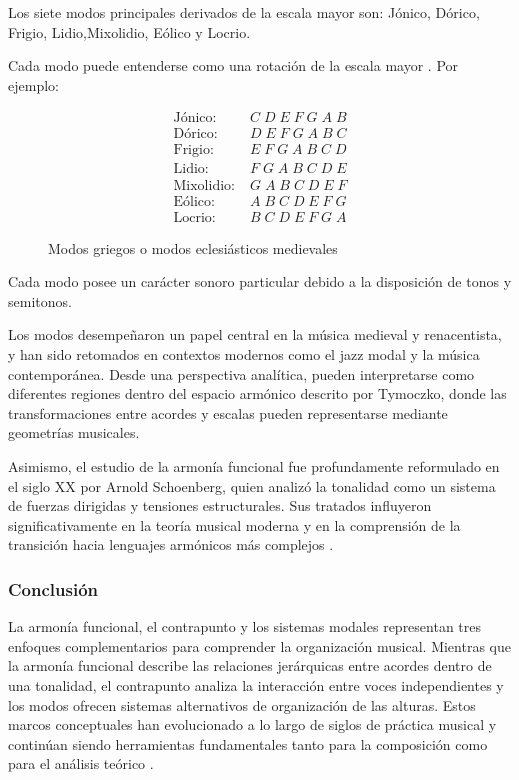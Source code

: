 \documentclass[12pt]{report}
\begin{document}
Los siete modos principales derivados de la escala mayor son: Jónico, Dórico, Frigio, Lidio,Mixolidio, Eólico y Locrio.


Cada modo puede entenderse como una rotación de la escala mayor \cite{carey1989aspects}. Por ejemplo:
\begin{figure}[h]
\centering
\[
\begin{aligned}
\text{Jónico:}      &\; C\; D\; E\; F\; G\; A\; B \\
\text{Dórico:}      &\; D\; E\; F\; G\; A\; B\; C \\
\text{Frigio:}      &\; E\; F\; G\; A\; B\; C\; D \\
\text{Lidio:}       &\; F\; G\; A\; B\; C\; D\; E \\
\text{Mixolidio:}   &\; G\; A\; B\; C\; D\; E\; F \\
\text{Eólico:}      &\; A\; B\; C\; D\; E\; F\; G \\
\text{Locrio:}      &\; B\; C\; D\; E\; F\; G\; A
\end{aligned}
\]
\caption{Modos griegos o modos eclesiásticos medievales}
\end{figure}

Cada modo posee un carácter sonoro particular debido a la disposición de tonos y semitonos.

Los modos desempeñaron un papel central en la música medieval y renacentista, y han sido retomados en contextos modernos como el jazz modal y la música contemporánea. Desde una perspectiva analítica, pueden interpretarse como diferentes regiones dentro del espacio armónico descrito por Tymoczko, donde las transformaciones entre acordes y escalas pueden representarse mediante geometrías musicales.

Asimismo, el estudio de la armonía funcional fue profundamente reformulado en el siglo XX por Arnold Schoenberg, quien analizó la tonalidad como un sistema de fuerzas dirigidas y tensiones estructurales. Sus tratados influyeron significativamente en la teoría musical moderna y en la comprensión de la transición hacia lenguajes armónicos más complejos \cite{brent2011modalogy}.

\subsubsection{Conclusión}

La armonía funcional, el contrapunto y los sistemas modales representan tres enfoques complementarios para comprender la organización musical. Mientras que la armonía funcional describe las relaciones jerárquicas entre acordes dentro de una tonalidad, el contrapunto analiza la interacción entre voces independientes y los modos ofrecen sistemas alternativos de organización de las alturas. Estos marcos conceptuales han evolucionado a lo largo de siglos de práctica musical y continúan siendo herramientas fundamentales tanto para la composición como para el análisis teórico \cite{pachet1998content}.
\end{document}
